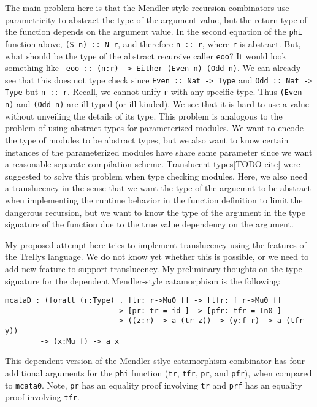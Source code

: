 \documentclass[letterpaper,12pt]{article}
\begin{document}
The main problem here is that the Mendler-style recursion combinators
use parametricity to abstract the type of the argument value, but
the return type of the function depends on the argument value.
In the second equation of the \verb|phi| function above,
\verb|(S n) :: N r|, and therefore \verb|n :: r|, where \verb|r|
is abstract. But, what should be the type of the abstract recursive caller
\verb|eoo|? It would look something like \texttt{
eoo :: (n:r) -> Either (Even n) (Odd n)}.
We can already see that this does not type check since
\verb|Even :: Nat -> Type| and \verb|Odd :: Nat -> Type|
but \verb|n :: r|.  Recall, we cannot unify \verb|r| with
any specific type.  Thus \verb|(Even n)| and \verb|(Odd n)|
are ill-typed (or ill-kinded).
We see that it is hard to use a value without unveiling the details of its type.
This problem is analogous to the problem of using abstract types for
parameterized modules. We want to encode the type of modules to be
abstract types, but we also want to know certain instances of
the parameterized modules have share same parameter since we want
a reasonable separate compilation scheme. Translucent types[TODO cite]
were suggested to solve this problem when type checking modules.
Here, we also need a translucency in the sense that we want the type of
the arguemnt to be abstract when implementing the runtime behavior
in the function definition to limit the dangerous recursion, but
we want to know the type of the argument in the type signature of
the function due to the true value dependency on the argument.

My proposed attempt here tries to implement translucency using
the features of the Trellys language. We do not know yet whether
this is possible, or we need to add new feature to support
translucency.  My preliminary thoughts on the type signature
for the dependent Mendler-style catamorphism is the following:
\begin{verbatim}
mcataD : (forall (r:Type) . [tr: r->Mu0 f] -> [tfr: f r->Mu0 f]
                         -> [pr: tr = id ] -> [pfr: tfr = In0 ]
                         -> ((z:r) -> a (tr z)) -> (y:f r) -> a (tfr y))
        -> (x:Mu f) -> a x
\end{verbatim}
This dependent version of the Mendler-stlye catamorphism combinator
has four additional arguments for the \verb|phi| function
(\verb|tr|, \verb|tfr|, \verb|pr|, and \verb|pfr|),
when compared to \verb|mcata0|.
Note, \verb|pr| has an equality proof involving \verb|tr| and
\verb|prf| has an equality proof involving \verb|tfr|.
\end{document}
